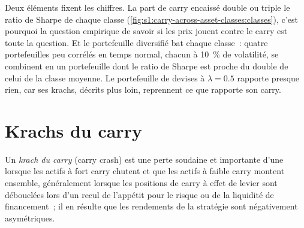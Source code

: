 Deux éléments fixent les chiffres. La part de carry encaissé double ou triple le ratio de Sharpe de chaque classe (\cref{fig:s1:carry-across-asset-classes:classes}),
c'est pourquoi la question empirique de savoir si les prix jouent contre le carry est toute la question. Et le portefeuille diversifié bat chaque classe~: quatre portefeuilles
peu corrélés en temps normal, chacun à 10~\% de volatilité, se combinent en un portefeuille dont le ratio de Sharpe est proche du double de celui de la classe moyenne. Le
portefeuille de devises à $\lambda = 0.5$ rapporte presque rien, car ses krachs, décrits plus loin, reprennent ce que rapporte son carry.

\begin{omfigure}

\label{fig:s1:carry-across-asset-classes:classes}
\end{omfigure}

\section{Krachs du carry}

\begin{definition}\label{def:s1:carry-across-asset-classes:crash}
Un \emph{krach du carry} (carry crash) est une perte soudaine et importante d'une  lorsque les actifs à fort carry chutent et que les actifs à faible carry montent ensemble,
généralement lorsque les positions de carry à effet de levier sont débouclées lors d'un recul de l'appétit pour le risque ou de la liquidité de financement~; il en résulte que les rendements de la stratégie sont négativement asymétriques.
\end{definition}

